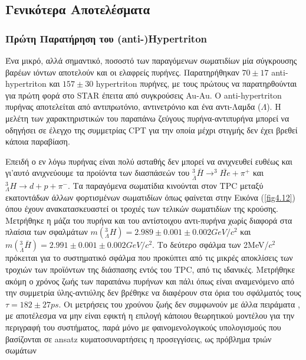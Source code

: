 	
	\subsection{Γενικότερα Αποτελέσματα}	
		\subsubsection{Πρώτη Παρατήρηση του (anti-)Hypertriton }
						
		Ένα μικρό, αλλά σημαντικό, ποσοστό των παραγόμενων σωματιδίων μία σύγκρουσης βαρέων ιόντων αποτελούν και οι ελαφρείς πυρήνες. Παρατηρήθηκαν $70\pm17$ anti-hypertriton και $157\pm30$ hypertriton πυρήνες, με τους πρώτους να παρατηρθούνται για πρώτη φορά στο STAR έπειτα από συγκρούσεις Au-Au. Ο anti-hypertriton  πυρήνας αποτελείται από αντιπρωτόνιο, αντινετρόνιο και ένα αντι-Λαμδα ($\Lambda$). Η μελέτη των χαρακτηριστικών του παραπάνω ζεύγους πυρήνα-αντιπυρήνα μπορεί να οδηγήσει σε έλεγχο της συμμετρίας CPT για την οποία μέχρι στιγμής δεν έχει βρεθεί κάποια παραβίαση. 
			
			Επειδή ο εν λόγω πυρήνας είναι πολύ ασταθής δεν μπορεί να ανιχνευθεί ευθέως και γι'αυτό ανιχνεύουμε τα προίόντα των διασπάσεών του $^3_{\bar{\Lambda}}\bar{H}\rightarrow ^3\bar{He}+ \pi^+$ 
	και $^3_\Lambda H\rightarrow d+p+\pi^-$.
			Τα  παραγόμενα σωματίδια κινούνται στον TPC μεταξύ εκατοντάδων άλλων φορτισμένων σωματιδίων όπως φαίνεται στην Εικόνα (\ref{fig4.12}) όπου έχουν ανακατασκευαστεί οι τροχιές των τελικών σωματιδίων της κρούσης.
		Μετρήθηκε η μάζα του πυρήνα και του αντίστοιχου αντι-πυρήνα χωρίς διαφορά στα πλαίσια των σφαλμάτων $m(^3_\Lambda H)=2.989\pm0.001\pm0.002GeV/c^2$ και $m(^3_{\bar{\Lambda}} \bar{H} ) = 2.991\pm0.001\pm0.002GeV/c^2$. Το δεύτερο σφάλμα των 2MeV/$c^2$ πρόκειται για το συστηματικό σφάλμα που προκύπτει από τις μικρές αποκλίσεις των τροχιών των προϊόντων της διάσπασης εντός του TPC, από τις ιδανικές.
		Μετρήθηκε ακόμη ο χρόνος ζωής των παραπάνω πυρήνων και πάλι όπως είναι αναμενόμενο από την συμμετρία ύλης-αντιύλης δεν βρέθηκε να διαφέρουν στα όρια του σφάλματός τους $\tau = 182\pm27ps$.
		Οι μετρήσεις του χρούνου ζωής δεν συμφωνούν με άλλα πειράματα , με αποτέλεσμα να μην είναι εφικτή η επιλογή κάποιου θεωρητικού μοντέλου για την περιγραφή του συστήματος, παρά μόνο με φαινομενολογικούς υπολογισμούς που βασίζονται σε ansatz κυματοσυναρτήσεις η προσεγγίσεις, ως πρόβλημα τριών σωμάτων
			
